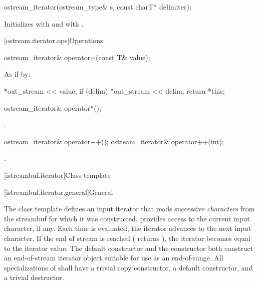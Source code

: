 %
\begin{itemdecl}
ostream_iterator(ostream_type& s, const charT* delimiter);
\end{itemdecl}

\begin{itemdescr}
\pnum
\effects
Initializes  with  and
 with .
\end{itemdescr}

[ostream.iterator.ops]{Operations}

%
\begin{itemdecl}
ostream_iterator& operator=(const T& value);
\end{itemdecl}

\begin{itemdescr}
\pnum
\effects
As if by:
\begin{codeblock}
*out_stream << value;
if (delim)
  *out_stream << delim;
return *this;
\end{codeblock}
\end{itemdescr}

%
\begin{itemdecl}
ostream_iterator& operator*();
\end{itemdecl}

\begin{itemdescr}
\pnum
\returns
{}.
\end{itemdescr}

%
\begin{itemdecl}
ostream_iterator& operator++();
ostream_iterator& operator++(int);
\end{itemdecl}

\begin{itemdescr}
\pnum
\returns
{}.
\end{itemdescr}

[istreambuf.iterator]{Class template }

[istreambuf.iterator.general]{General}

\pnum
The
class template
defines an input iterator that
reads successive
\textit{characters}
from the streambuf for which it was constructed.
provides access to the current input character, if any.
Each time
is evaluated, the iterator advances to the next input character.
If the end of stream is reached ( returns
),
the iterator becomes equal to the
iterator value.
The default constructor
and the constructor
both construct an end-of-stream iterator object suitable for use
as an end-of-range.
All specializations of  shall have a trivial copy
constructor, a  default constructor, and a trivial destructor.

